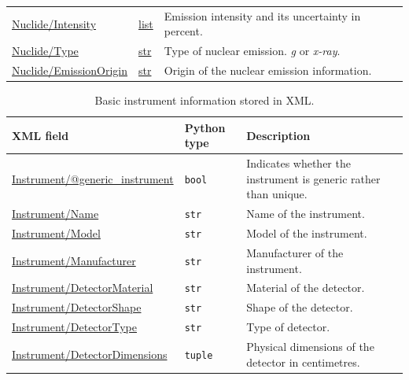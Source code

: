 \begin{table}[H]
\begin{tabular}{p{} p{} p{}}
    \url{Nuclide/Intensity}
        & \url{list}
        & Emission intensity and its uncertainty in percent. \\

    \url{Nuclide/Type}
        & \url{str}
        & Type of nuclear emission. \textit{g} or \textit{x-ray}. \\

    \url{Nuclide/EmissionOrigin}
        & \url{str}
        & Origin of the nuclear emission information. \\

    \bottomrule
    \end{tabular}
\end{table}

\begin{table}[H]
    \centering
    \caption{Basic instrument information stored in XML.}
    \label{tab:instrument-basic-xml}
    \begin{tabular}{>{\raggedright\arraybackslash}p{}
                    >{\raggedright\arraybackslash}p{}
                    >{\raggedright\arraybackslash}p{}}
    \toprule
    \textbf{XML field} & \textbf{Python type} & \textbf{Description} \\ \midrule

    \url{Instrument/@generic_instrument}
        & \texttt{bool}
        & Indicates whether the instrument is generic rather than unique. \\

    \url{Instrument/Name}
        & \texttt{str}
        & Name of the instrument. \\

    \url{Instrument/Model}
        & \texttt{str}
        & Model of the instrument. \\

    \url{Instrument/Manufacturer}
        & \texttt{str}
        & Manufacturer of the instrument. \\

    \url{Instrument/DetectorMaterial}
        & \texttt{str}
        & Material of the detector. \\

    \url{Instrument/DetectorShape}
        & \texttt{str}
        & Shape of the detector. \\

    \url{Instrument/DetectorType}
        & \texttt{str}
        & Type of detector. \\

    \url{Instrument/DetectorDimensions}
        & \texttt{tuple}
        & Physical dimensions of the detector in centimetres. \\


\end{tabular}
\end{table}
